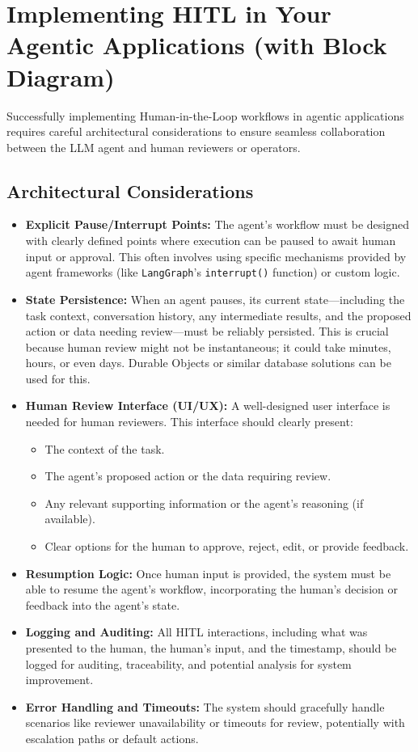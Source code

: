 \section{Implementing HITL in Your Agentic Applications (with Block Diagram)}
Successfully implementing Human-in-the-Loop workflows in agentic applications requires careful architectural considerations to 
ensure seamless collaboration between the LLM agent and human reviewers or operators.

\subsection*{Architectural Considerations}
\begin{itemize}
    \item \textbf{Explicit Pause/Interrupt Points:} The agent's workflow must be designed with clearly defined points where 
    execution can be paused to await human input or approval. This often involves using specific mechanisms provided by agent
     frameworks (like \texttt{LangGraph}'s \texttt{interrupt()} function) or custom logic.
    \item \textbf{State Persistence:} When an agent pauses, its current state—including the task context, conversation history,
     any intermediate results, and the proposed action or data needing review—must be reliably persisted. This is crucial because human 
     review might not be instantaneous; it could take minutes, hours, or even days. Durable Objects or similar database solutions can be used for this.
    \item \textbf{Human Review Interface (UI/UX):} A well-designed user interface is needed for human reviewers. This interface should clearly present:
    \begin{itemize}
        \item The context of the task.
        \item The agent's proposed action or the data requiring review.
        \item Any relevant supporting information or the agent's reasoning (if available).
        \item Clear options for the human to approve, reject, edit, or provide feedback.
    \end{itemize}
    \item \textbf{Resumption Logic:} Once human input is provided, the system must be able to resume the agent's workflow, incorporating 
    the human's decision or feedback into the agent's state.
    \item \textbf{Logging and Auditing:} All HITL interactions, including what was presented to the human, the human's input, and the timestamp, 
    should be logged for auditing, traceability, and potential analysis for system improvement.
    \item \textbf{Error Handling and Timeouts:} The system should gracefully handle scenarios like reviewer unavailability or timeouts for review, 
    potentially with escalation paths or default actions.
\end{itemize}

